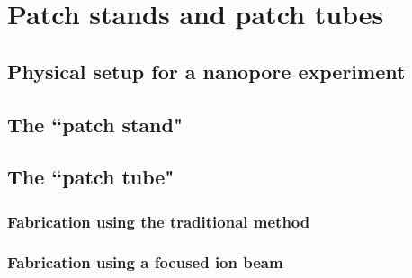 \chapter{Patch stands and patch tubes}
\label{patch_stands_tubes}

\section{Physical setup for a nanopore experiment}

\section{The ``patch stand"}

\section{The ``patch tube"}

\subsection{Fabrication using the traditional method}

\subsection{Fabrication using a focused ion beam}
